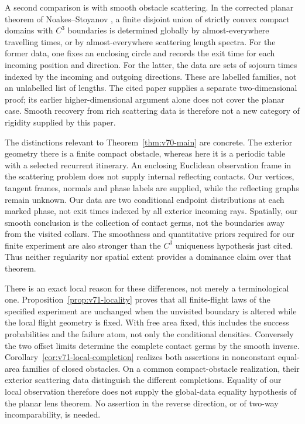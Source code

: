 \label{sec:v71-lens-comparison}
A second comparison is with smooth obstacle scattering.  In the corrected
planar theorem of Noakes--Stoyanov \cite[Theorem~1.1]{NoakesStoyanov2020},
a finite disjoint union of strictly convex compact domains with $C^3$
boundaries is determined globally by almost-everywhere travelling times,
or by almost-everywhere scattering length spectra.  For the former data,
one fixes an enclosing circle and records the exit time for each incoming
position and direction.  For the latter, the data are sets of sojourn times
indexed by the incoming and outgoing directions.  These are labelled
families, not an unlabelled list of lengths.  The cited paper supplies a
separate two-dimensional proof; its earlier higher-dimensional argument
alone does not cover the planar case.  Smooth recovery from rich scattering
data is therefore not a new category of rigidity supplied by this paper.

The distinctions relevant to Theorem~\ref{thm:v70-main} are concrete.
The exterior geometry there is a finite compact obstacle, whereas here it
is a periodic table with a selected recurrent itinerary.  An enclosing
Euclidean observation frame in the scattering problem does not supply
internal reflecting contacts.  Our vertices, tangent frames, normals and
phase labels are supplied, while the reflecting graphs remain unknown.
Our data are two conditional endpoint distributions at each marked phase,
not exit times indexed by all exterior incoming rays.  Spatially, our
smooth conclusion is the collection of contact germs, not the boundaries
away from the visited collars.  The smoothness and quantitative priors
required for our finite experiment are also stronger than the $C^3$
uniqueness hypothesis just cited.  Thus neither regularity nor spatial
extent provides a dominance claim over that theorem.

There is an exact local reason for these differences, not merely a
terminological one.  Proposition~\ref{prop:v71-locality} proves that all
finite-flight laws of the specified experiment are unchanged when the
unvisited boundary is altered while the local flight geometry is fixed.
With free area fixed, this includes the success probabilities and the
failure atom, not only the conditional densities.  Conversely the two
offset limits determine the complete contact germs by the smooth inverse.
Corollary~\ref{cor:v71-local-completion} realizes both assertions in
nonconstant equal-area families of closed obstacles.  On a common
compact-obstacle realization, their exterior scattering data distinguish
the different completions.  Equality of our local observation therefore
does not supply the global-data equality hypothesis of the planar lens
theorem.  No assertion in the reverse direction, or of two-way
incomparability, is needed.

